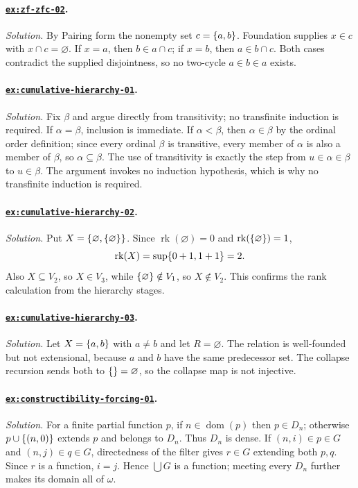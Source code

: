 \documentclass[11pt,oneside,openany]{book}
\theoremstyle{definition}
\theoremstyle{plain}
\theoremstyle{remark}
\DeclarePairedDelimiter{\set}{\lbrace}{\rbrace}
\newcommand{\dom}{\operatorname{dom}}
\newcommand{\rank}{\operatorname{rk}}
\begin{document}
\paragraph{\hyperref[ex:zf-zfc-02]{\texttt{ex:zf-zfc-02}}.}
\textit{Solution.}  By Pairing form the nonempty set \(c=\set{a,b}\).
Foundation supplies \(x\in c\) with \(x\cap c=\varnothing\).  If \(x=a\),
then \(b\in a\cap c\); if \(x=b\), then \(a\in b\cap c\).  Both cases
contradict the supplied disjointness, so no two-cycle \(a\in b\in a\) exists.

\paragraph{\hyperref[ex:cumulative-hierarchy-01]{\texttt{ex:cumulative-hierarchy-01}}.}
\textit{Solution.}  Fix \(\beta\) and argue directly from transitivity;
no transfinite induction is required.  If
\(\alpha=\beta\), inclusion is immediate.  If \(\alpha<\beta\), then
\(\alpha\in\beta\) by the ordinal order definition; since every ordinal
\(\beta\) is transitive, every member of \(\alpha\) is also a member of
\(\beta\), so \(\alpha\subseteq\beta\).  The use of transitivity is exactly the
step from \(u\in\alpha\in\beta\) to \(u\in\beta\).  The argument
invokes no induction hypothesis, which is why no transfinite induction is
required.

\paragraph{\hyperref[ex:cumulative-hierarchy-02]{\texttt{ex:cumulative-hierarchy-02}}.}
\textit{Solution.}  Put \(X=\set{\varnothing,\set\varnothing}\).  Since
\(\rank(\varnothing)=0\) and \(\rank(\set\varnothing)=1\),
\[
\rank(X)=\sup\set{0+1,1+1}=2.
\]
Also \(X\subseteq V_2\), so \(X\in V_3\), while
\(\set\varnothing\notin V_1\), so \(X\notin V_2\).  This confirms the rank
calculation from the hierarchy stages.

\paragraph{\hyperref[ex:cumulative-hierarchy-03]{\texttt{ex:cumulative-hierarchy-03}}.}
\textit{Solution.}  Let \(X=\set{a,b}\) with \(a\ne b\) and let
\(R=\varnothing\).  The relation is well-founded but not extensional, because
\(a\) and \(b\) have the same predecessor set.  The collapse recursion sends
both to \(\set{}=\varnothing\), so the collapse map is not injective.

\paragraph{\hyperref[ex:constructibility-forcing-01]{\texttt{ex:constructibility-forcing-01}}.}
\textit{Solution.}  For a finite partial function \(p\), if
\(n\in\dom(p)\) then \(p\in D_n\); otherwise
\(p\cup\set{(n,0)}\) extends \(p\) and belongs to \(D_n\).  Thus \(D_n\) is
dense.  If \((n,i)\in p\in G\) and \((n,j)\in q\in G\), directedness of the
filter gives \(r\in G\) extending both \(p,q\).  Since \(r\) is a function,
\(i=j\).  Hence \(\bigcup G\) is a function; meeting every \(D_n\) further
makes its domain all of \(\omega\).
\end{document}
